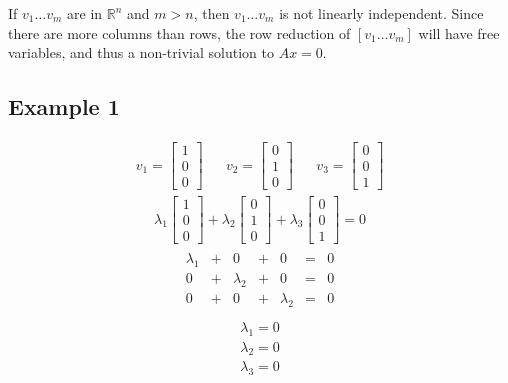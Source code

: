 \documentclass{article}
\theoremstyle{mytheoremstyle}
\theoremstyle{mytheoremstyle}
\theoremstyle{myproblemstyle}
\begin{document}
    If $v_1\dots v_m$ are in $\mathbb{R}^n$ and $m>n$, then $v_1\dots v_m$ is not
    linearly independent.
    Since there are more columns than rows,
    the row reduction of $[v_1\dots v_m]$ will have free variables, and thus a non-trivial solution
    to $Ax=0$.

    \subsection*{Example 1}
    \begin{align*}
        v_1 = \begin{bmatrix}
            1 \\ 0 \\ 0
        \end{bmatrix} &&
        v_2 = \begin{bmatrix}
            0 \\ 1 \\ 0
        \end{bmatrix} &&
        v_3 = \begin{bmatrix}
            0 \\ 0 \\ 1
        \end{bmatrix}
    \end{align*}
    \begin{align*}
        \lambda_1 \begin{bmatrix}
            1 \\ 0 \\ 0
        \end{bmatrix} +
        \lambda_2 \begin{bmatrix}
            0 \\ 1 \\ 0
        \end{bmatrix} +
        \lambda_3 \begin{bmatrix}
            0 \\ 0 \\ 1
        \end{bmatrix} = 0
    \end{align*}
    \begin{align*}
        \begin{matrix}
            \lambda_1 &+& 0 &+& 0 &=& 0 \\
            0 &+& \lambda_2 &+& 0 &=& 0 \\
            0 &+& 0 &+& \lambda_2 &=& 0 \\
        \end{matrix}
    \end{align*}
    \begin{align*}
        \lambda_1 = 0 \\
        \lambda_2 = 0 \\
        \lambda_3 = 0
    \end{align*}
\end{document}
